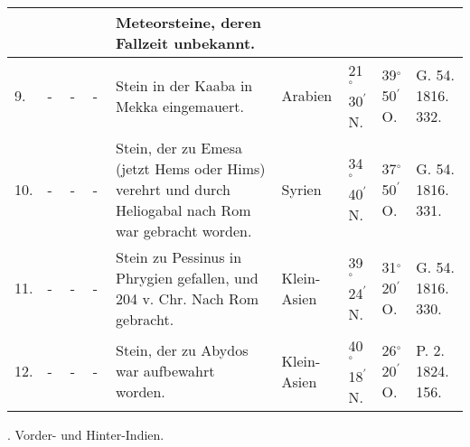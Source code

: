\documentclass[a4paper, 8pt, oneside, polutonikogreek, german]{article}
\begin{document}
\begin{table}[!ht]
\begin{tabular}{|l|l|l|l|l|l|l|l|l|}
          &   &   &   & Meteorsteine, deren Fallzeit unbekannt. &   &   &   &   \\ \hline
        9. & - & - & - & Stein in der Kaaba in Mekka eingemauert. & Arabien & 21$^\circ$ 30$^\prime$ N. & 39$^\circ$ 50$^\prime$ O. & G. 54. 1816. 332. \\ \hline
        10. & - & - & - & Stein, der zu Emesa (jetzt Hems oder Hims) verehrt und durch Heliogabal nach Rom war gebracht worden. & Syrien & 34$^\circ$ 40$^\prime$ N. & 37$^\circ$ 50$^\prime$ O. & G. 54. 1816. 331. \\ \hline
        11. & - & - & - & Stein zu Pessinus in Phrygien gefallen, und 204 v. Chr. Nach Rom gebracht. & Klein-Asien & 39$^\circ$ 24$^\prime$ N. & 31$^\circ$ 20$^\prime$ O. & G. 54. 1816. 330. \\ \hline
        12. & - & - & - & Stein, der zu Abydos war aufbewahrt worden. & Klein-Asien & 40$^\circ$ 18$^\prime$ N. & 26$^\circ$ 20$^\prime$ O. & P. 2. 1824. 156. \\ \hline
    \end{tabular}
\end{table}
. Vorder- und Hinter-Indien.
\end{document}
